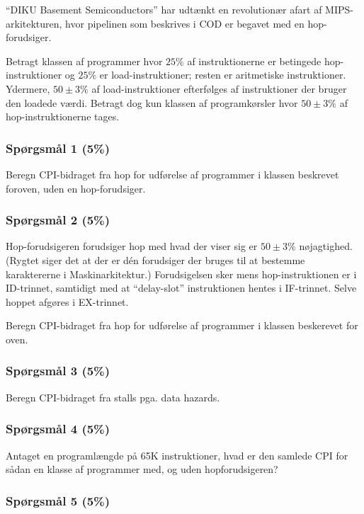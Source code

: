 ``DIKU Basement Semiconductors'' har udtænkt en revolutionær afart af
MIPS-arkitekturen, hvor pipelinen som beskrives i COD er begavet med en
hop-forudsiger.

Betragt klassen af programmer hvor $25\%$ af instruktionerne er betingede
hop-instruktioner og $25\%$ er load-instruktioner; resten er aritmetiske
instruktioner.  Ydermere, $50\pm 3\%$ af load-instruktioner efterfølges af
instruktioner der bruger den loadede værdi.  Betragt dog kun klassen af
programkørsler hvor $50 \pm 3\%$ af hop-instruktionerne tages.


\subsubsection{Spørgsmål 1 (5\%)}

Beregn CPI-bidraget fra hop for udførelse af programmer i klassen beskrevet
foroven, uden en hop-forudsiger.


\subsubsection{Spørgsmål 2 (5\%)}

Hop-forudsigeren forudsiger hop med hvad der viser sig er $50 \pm 3\%$
nøjagtighed.  (Rygtet siger det at der er dén forudsiger der bruges til at
bestemme karaktererne i Maskinarkitektur.)  Forudsigelsen sker mens
hop-instruktionen er i ID-trinnet, samtidigt med at ``delay-slot''
instruktionen hentes i IF-trinnet.  Selve hoppet afgøres i EX-trinnet.

Beregn CPI-bidraget fra hop for udførelse af programmer i klassen beskerevet for
oven.


\subsubsection{Spørgsmål 3 (5\%)}

Beregn CPI-bidraget fra stalls pga. data hazards.


\subsubsection{Spørgsmål 4 (5\%)}

Antaget en programlængde på 65K instruktioner, hvad er den samlede CPI for
sådan en klasse af programmer med, og uden hopforudsigeren?


\subsubsection{Spørgsmål 5 (5\%)}

